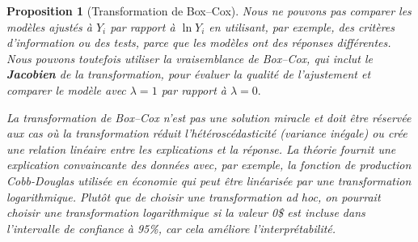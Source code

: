 \documentclass[
  11pt,
  letterpaper,
]{scrbook}
\theoremstyle{plain}
\newtheorem{proposition}{Proposition}[chapter]
\theoremstyle{plain}
\theoremstyle{definition}
\theoremstyle{definition}
\theoremstyle{remark}
\begin{document}
\begin{proposition}[Transformation de
Box--Cox]
Nous ne pouvons pas comparer les modèles ajustés à \(Y_i\) par rapport à
\(\ln Y_i\) en utilisant, par exemple, des critères d'information ou des
tests, parce que les modèles ont des réponses différentes. Nous pouvons
toutefois utiliser la vraisemblance de Box--Cox, qui inclut le
\textbf{Jacobien} de la transformation, pour évaluer la qualité de
l'ajustement et comparer le modèle avec \(\lambda=1\) par rapport à
\(\lambda=0.\)

La transformation de Box--Cox n'est pas une solution miracle et doit
être réservée aux cas où la transformation réduit l'hétéroscédasticité
(variance inégale) ou crée une relation linéaire entre les explications
et la réponse. La théorie fournit une explication convaincante des
données avec, par exemple, la fonction de production Cobb-Douglas
utilisée en économie qui peut être linéarisée par une transformation
logarithmique. Plutôt que de choisir une transformation \emph{ad hoc},
on pourrait choisir une transformation logarithmique si la valeur 0\$
est incluse dans l'intervalle de confiance à 95\%, car cela améliore
l'interprétabilité.

\end{proposition}
\end{document}
